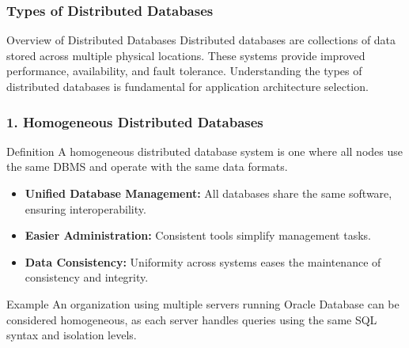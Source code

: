 \documentclass[aspectratio=169]{beamer}
\begin{document}
\begin{frame}[fragile]
    \frametitle{Types of Distributed Databases}
    \begin{block}{Overview of Distributed Databases}
        Distributed databases are collections of data stored across multiple physical locations. 
        These systems provide improved performance, availability, and fault tolerance. 
        Understanding the types of distributed databases is fundamental for application architecture selection.
    \end{block}
\end{frame}

\begin{frame}[fragile]
    \frametitle{1. Homogeneous Distributed Databases}
    \begin{block}{Definition}
        A homogeneous distributed database system is one where all nodes use the same DBMS and operate with the same data formats.
    \end{block}
    
    \begin{itemize}
        \item \textbf{Unified Database Management:} All databases share the same software, ensuring interoperability.
        \item \textbf{Easier Administration:} Consistent tools simplify management tasks.
        \item \textbf{Data Consistency:} Uniformity across systems eases the maintenance of consistency and integrity.
    \end{itemize}
    
    \begin{block}{Example}
        An organization using multiple servers running Oracle Database can be considered homogeneous, 
        as each server handles queries using the same SQL syntax and isolation levels.
    \end{block}
\end{frame}
\end{document}
